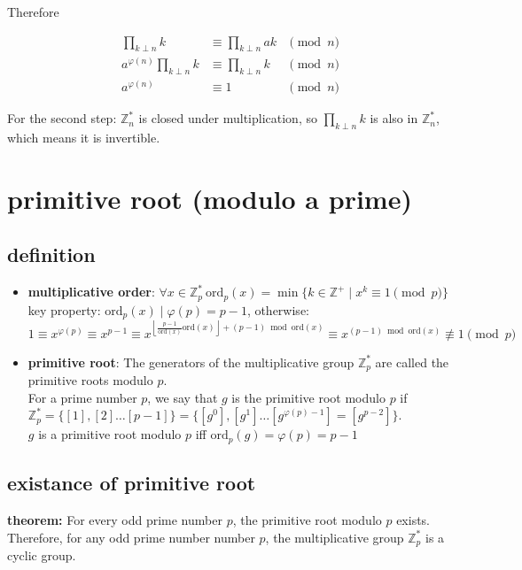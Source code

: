 \documentclass{article}
\newcommand{\ZZ}{\mathbb{Z}}
\newcommand{\floor}[1]{\left\lfloor{#1}\right\rfloor}
\begin{document}
Therefore

\[
	\begin{aligned}
		\prod_{k\perp n} k                & \equiv \prod_{k\perp n} ak & \pmod n \\
		a^{\varphi(n)} \prod_{k\perp n} k & \equiv \prod_{k\perp n} k  & \pmod n \\
		a^{\varphi(n)}                    & \equiv 1                   & \pmod n
	\end{aligned}
\]

For the second step: $\ZZ_n^\ast$ is closed under multiplication,
so $\prod_{k\perp n} k$ is also in $\ZZ_n^\ast$, which means it is invertible.


\newpage
\section{primitive root (modulo a prime)}

\newcommand{\ord}{\mathrm{ord}}
\subsection{definition}

\begin{itemize}
	\item \textbf{multiplicative order}:
	      $\forall x\in \ZZ_p^\ast\ \ord_p(x)=\min\{k\in \ZZ^+\mid x^k\equiv 1\pmod p\}$\\
				key property: $\ord_p(x) \mid \varphi(p)=p-1$, otherwise:
				\[
					1
					\equiv x^{\varphi(p)}
					\equiv x^{p-1}
					\equiv x^{\floor{\frac{p-1}{\ord(x)}\ord(x)}+(p-1)\bmod \ord(x)}
					\equiv x^{(p-1)\bmod \ord(x)}
					\not\equiv 1
					\pmod p
				\]
	\item \textbf{primitive root}:
	      The generators of the multiplicative group $\ZZ_p^\ast$ are called the primitive roots modulo $p$.\\
	      For a prime number $p$, we say that $g$ is the primitive root modulo $p$ if $\ZZ_p^\ast = \{[1],[2]\ldots [p-1]\}=\{[g^0],[g^1]\ldots [g^{\varphi(p)-1}]=[g^{p-2}]\}$.\\
				$g$ is a primitive root modulo $p$ iff $\ord_p(g)=\varphi(p)=p-1$
\end{itemize}

\subsection{existance of primitive root}

\textbf{theorem: }For every odd prime number $p$, the primitive root modulo $p$ exists.\\
Therefore, for any odd prime number number $p$, the multiplicative group $\ZZ_p^\ast$ is a cyclic group.
\end{document}
